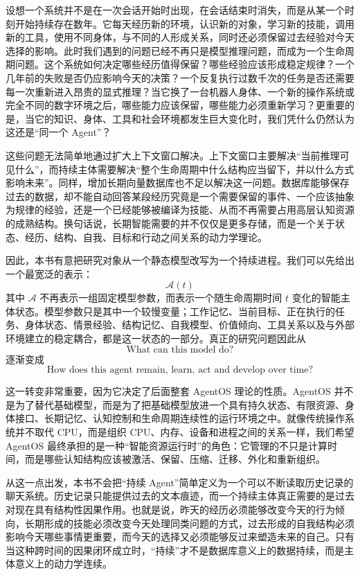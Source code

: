 设想一个系统并不是在一次会话开始时出现，在会话结束时消失，而是从某一个时刻开始持续存在数年。它每天经历新的环境，认识新的对象，学习新的技能，调用新的工具，使用不同身体，与不同的人形成关系，同时还必须保留过去经验对今天选择的影响。此时我们遇到的问题已经不再只是模型推理问题，而成为一个生命周期问题。这个系统如何决定哪些经历值得保留？哪些经验应该形成稳定规律？一个几年前的失败是否仍应影响今天的决策？一个反复执行过数千次的任务是否还需要每一次重新进入昂贵的显式推理？当它换了一台机器人身体、一个新的操作系统或完全不同的数字环境之后，哪些能力应该保留，哪些能力必须重新学习？更重要的是，当它的知识、身体、工具和社会环境都发生巨大变化时，我们凭什么仍然认为这还是“同一个 Agent”？

这些问题无法简单地通过扩大上下文窗口解决。上下文窗口主要解决“当前推理可见什么”，而持续主体需要解决“整个生命周期中什么结构应当留下，并以什么方式影响未来”。同样，增加长期向量数据库也不足以解决这一问题。数据库能够保存过去的数据，却不能自动回答某段经历究竟是一个需要保留的事件、一个应该抽象为规律的经验，还是一个已经能够被编译为技能、从而不再需要占用高层认知资源的成熟结构。换句话说，长期智能需要的并不仅仅是更多存储，而是一个关于状态、经历、结构、自我、目标和行动之间关系的动力学理论。

因此，本书有意把研究对象从一个静态模型改写为一个持续进程。我们可以先给出一个最宽泛的表示：
\[
\mathcal{A}(t)
\]
其中 $\mathcal{A}$ 不再表示一组固定模型参数，而表示一个随生命周期时间 $t$ 变化的智能主体状态。模型参数只是其中一个较慢变量；工作记忆、当前目标、正在执行的任务、身体状态、情景经验、结构记忆、自我模型、价值倾向、工具关系以及与外部环境建立的稳定耦合，都是这一状态的一部分。真正的研究问题因此从
\[
\text{What can this model do?}
\]
逐渐变成
\[
\text{How does this agent remain, learn, act and develop over time?}
\]

这一转变非常重要，因为它决定了后面整套 AgentOS 理论的性质。AgentOS 并不是为了替代基础模型，而是为了把基础模型放进一个具有持久状态、有限资源、身体接口、长期记忆、认知控制和生命周期连续性的运行环境之中。就像传统操作系统并不取代 CPU，而是组织 CPU、内存、设备和进程之间的关系一样，我们希望 AgentOS 最终承担的是一种“智能资源运行时”的角色：它管理的不只是计算时间，而是哪些认知结构应该被激活、保留、压缩、迁移、外化和重新组织。

从这一点出发，本书不会把“持续 Agent”简单定义为一个可以不断读取历史记录的聊天系统。历史记录只能提供过去的文本痕迹，而一个持续主体真正需要的是过去对现在具有结构性因果作用。也就是说，昨天的经历必须能够改变今天的行为倾向，长期形成的技能必须改变今天处理同类问题的方式，过去形成的自我结构必须影响今天哪些事情更重要，而今天的选择又必须能够反过来塑造未来的自己。只有当这种跨时间的因果闭环成立时，“持续”才不是数据库意义上的数据持续，而是主体意义上的动力学连续。

